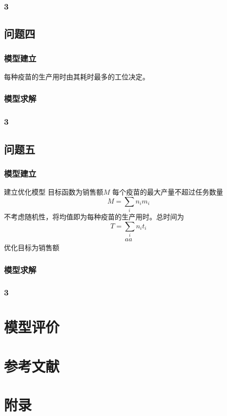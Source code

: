 \documentclass[UTF8]{ctexart}
\begin{document}
	\subsubsection{3}
	
	\subsection{问题四}
	\subsubsection{模型建立}
	每种疫苗的生产用时由其耗时最多的工位决定。
	\subsubsection{模型求解}
	\subsubsection{3}
	
	\subsection{问题五}
	\subsubsection{模型建立}
	建立优化模型
	目标函数为销售额$M$
	每个疫苗的最大产量不超过任务数量
	\begin{equation}
		M=\sum_{i}n_{i}m_{i}
	\end{equation}
	不考虑随机性，将均值即为每种疫苗的生产用时。总时间为
	\begin{equation}
		T=\sum_{i}n_{i}t_{i}
	\end{equation}
	\begin{equation}
	\begin{split}
		aa
	\end{split}
	\end{equation}
	优化目标为销售额
	\subsubsection{模型求解}
	\subsubsection{3}
	
	\section{模型评价}
	
	
	\section{参考文献}
	
	\section{附录}
	\begin{appendices}
		
	\end{appendices}
	
\end{document}

